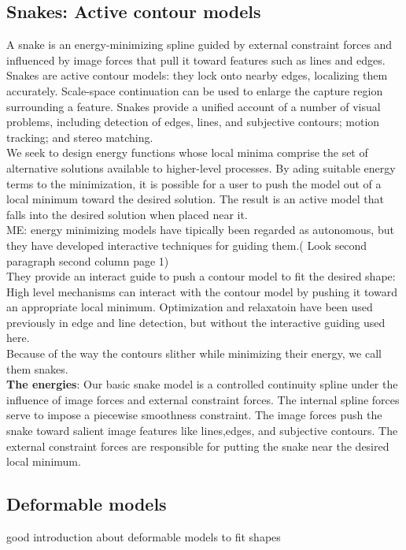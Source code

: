 \documentclass{article}
\begin{document}
\subsection{Snakes: Active contour models}
A snake is an energy-minimizing     spline guided by external 
constraint forces and influenced by image forces that pull it toward 
features such as lines and edges. Snakes are active contour models: they lock
 onto nearby edges, localizing them accurately. Scale-space continuation can
 be used to enlarge the capture region surrounding a feature. Snakes provide 
a unified account of a number of visual problems, including detection of 
edges, lines, and subjective contours; motion tracking; and stereo matching.\\

We seek to design energy functions whose local minima comprise the set of 
alternative solutions available to higher-level processes.
By ading suitable energy terms to the minimization, it is possible for a user
to push the model out of a local minimum toward the desired solution. The result
is an active model that falls into the desired solution when placed near it.\\

ME: energy minimizing models have tipically been regarded as autonomous, but
they have developed interactive techniques for guiding them.( Look second
paragraph second column page 1)\\

They provide an interact guide to push a contour model to fit the desired
shape: High level mechanisms can interact with the contour model by pushing it
toward an appropriate local minimum. Optimization and relaxatoin have 
been used previously in edge and line detection, but without the interactive
guiding used here.\\

Because of the way the contours slither while minimizing their energy, we 
call them snakes.\\

\textbf{The energies}: Our basic snake model is a controlled continuity
spline under the influence of image forces and external constraint forces.
The internal spline forces serve to impose a piecewise smoothness constraint.
The image forces push the snake toward salient image features like lines,edges,
and subjective contours. The external constraint forces are responsible for 
putting the snake near the desired local minimum.


\subsection{Deformable models}
good introduction about deformable models to fit shapes\\
\end{document}
